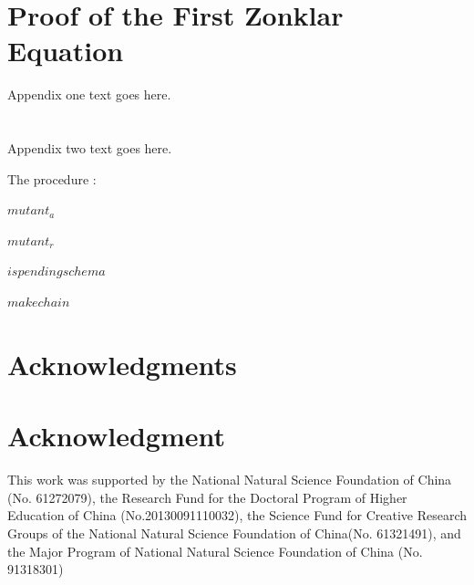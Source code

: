 \documentclass[10pt,journal,cspaper,compsoc]{IEEEtran}
\begin{document}
%


\appendices
\section{Proof of the First Zonklar Equation}
Appendix one text goes here.

\section{}
Appendix two text goes here.

The procedure :

$mutant_a$

$mutant_r$

$is pending schema$

$makechain$


\ifCLASSOPTIONcompsoc
  \section*{Acknowledgments}
\else
  \section*{Acknowledgment}
\fi


This work was supported by the National Natural Science Foundation of China (No. 61272079), the Research Fund for the Doctoral Program of Higher Education of China (No.20130091110032), the Science Fund for Creative Research Groups of the National Natural Science Foundation of China(No. 61321491), and the Major Program of National Natural Science Foundation of China (No. 91318301)
\end{document}
